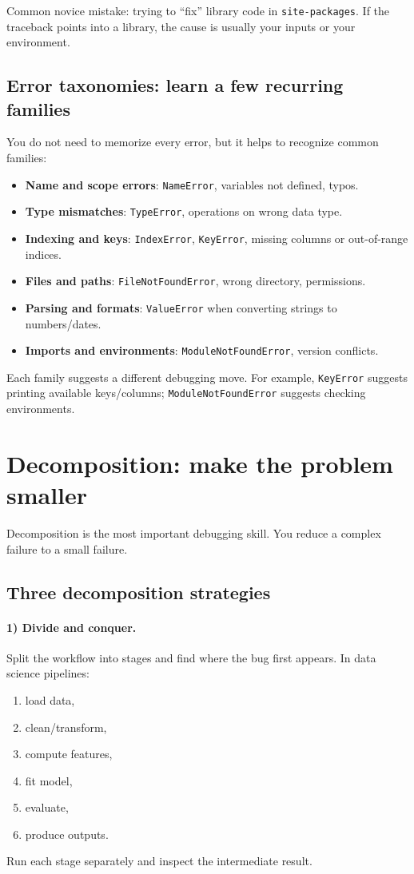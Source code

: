 Common novice mistake: trying to ``fix'' library code in \texttt{site-packages}. If the traceback points into a library, the cause is usually your inputs or your environment.

\subsection{Error taxonomies: learn a few recurring families}
You do not need to memorize every error, but it helps to recognize common families:
\begin{itemize}[noitemsep]
  \item \textbf{Name and scope errors}: \texttt{NameError}, variables not defined, typos.
  \item \textbf{Type mismatches}: \texttt{TypeError}, operations on wrong data type.
  \item \textbf{Indexing and keys}: \texttt{IndexError}, \texttt{KeyError}, missing columns or out-of-range indices.
  \item \textbf{Files and paths}: \texttt{FileNotFoundError}, wrong directory, permissions.
  \item \textbf{Parsing and formats}: \texttt{ValueError} when converting strings to numbers/dates.
  \item \textbf{Imports and environments}: \texttt{ModuleNotFoundError}, version conflicts.
\end{itemize}

Each family suggests a different debugging move. For example, \texttt{KeyError} suggests printing available keys/columns; \texttt{ModuleNotFoundError} suggests checking environments.

\section{Decomposition: make the problem smaller}
Decomposition is the most important debugging skill. You reduce a complex failure to a small failure.

\subsection{Three decomposition strategies}
\paragraph{1) Divide and conquer.} Split the workflow into stages and find where the bug first appears. In data science pipelines:
\begin{enumerate}[noitemsep]
  \item load data,
  \item clean/transform,
  \item compute features,
  \item fit model,
  \item evaluate,
  \item produce outputs.
\end{enumerate}
Run each stage separately and inspect the intermediate result.

